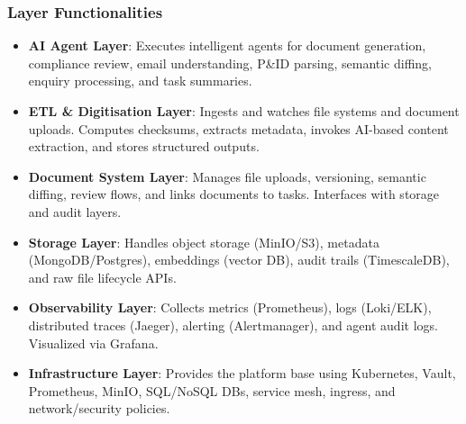 \begin{frame}
  \frametitle{Layer Functionalities}
  \begin{itemize}
    \item \textbf{AI Agent Layer}: Executes intelligent agents for document generation, compliance review, email understanding, P\&ID parsing, semantic diffing, enquiry processing, and task summaries.
    \item \textbf{ETL \& Digitisation Layer}: Ingests and watches file systems and document uploads. Computes checksums, extracts metadata, invokes AI-based content extraction, and stores structured outputs.
    \item \textbf{Document System Layer}: Manages file uploads, versioning, semantic diffing, review flows, and links documents to tasks. Interfaces with storage and audit layers.
    \item \textbf{Storage Layer}: Handles object storage (MinIO/S3), metadata (MongoDB/Postgres), embeddings (vector DB), audit trails (TimescaleDB), and raw file lifecycle APIs.
    \item \textbf{Observability Layer}: Collects metrics (Prometheus), logs (Loki/ELK), distributed traces (Jaeger), alerting (Alertmanager), and agent audit logs. Visualized via Grafana.
    \item \textbf{Infrastructure Layer}: Provides the platform base using Kubernetes, Vault, Prometheus, MinIO, SQL/NoSQL DBs, service mesh, ingress, and network/security policies.
  \end{itemize}
\end{frame}


